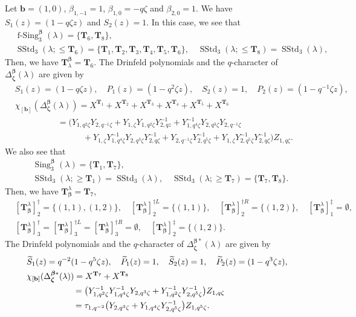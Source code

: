 \documentclass[12pt]{amsart}
\numberwithin{equation}{thm}
\newcommand\bT{\mathbf T}
\newcommand\bb{\mathbf b}
\renewcommand\b{\beta}   %
\newcommand\z{\zeta}
\newcommand\la{\lambda}
\newcommand\ta{\tau}
\newcommand\D{\Delta}
\newcommand\Bb{\boldsymbol\beta}
\newcommand\Bz{\boldsymbol\zeta}
\newcommand\wt{\widetilde}
\newcommand{\SStd}{\operatorname{SStd}}
\newcommand{\Sing}{\operatorname{Sing}}
\newcommand{\fSing}{\operatorname{f-Sing}}
\begin{document}
Let $\bb=(1,0)$, $\b_{1,-1}=1 $, $\b_{1,0}= - q \z$ and $\b_{2,0}=1$. 
We have $S_1(z) = (1 - q \z  z)$ and $S_2(z)=1$. 
In this case, we see that 
\begin{align*}
&\fSing_3^{\Bb} (\la) = \{ \bT_6, \bT_8\}, 
\\
&\SStd_3 (\la ; \leq \bT_6) = \{ \bT_1, \bT_2, \bT_3, \bT_4, \bT_5, \bT_6\}, 
\quad 
\SStd_3 (\la ; \leq \bT_8) = \SStd_3 (\la), 
\end{align*}
Then, we have 
$\bT_{\la}^{\Bb} = \bT_6$. 
The Drinfeld polynomials and the $q$-character of $\D_{\Bz}^{\Bb} (\la)$ are given by 
\begin{align*}
&S_1(z) = (1 - q\z  z), \quad P_1(z) = (1- q^{2} \z z), 
\quad 
S_2(z) =1, \quad P_2(z) = (1 - q^{-1} \z z), 
\\
& \chi_{[\bb]} (\D_{\Bz}^{\Bb}(\la)) 
= X^{\bT_1} + X^{\bT_2} + X^{\bT_3} + X^{\bT_4} + X^{\bT_5} + X^{\bT_6} 
\\& \hspace{5em} 
=  
	\big( Y_{1, q^2 \z}   Y_{2, q^{-1} \z} 
		+ Y_{1, \z} Y_{1, q^2 \z} Y_{2, q z}^{-1} 
		+ Y_{1, q^4 \z}^{-1} Y_{2, q^3 \z} Y_{2, q^{-1} \z} 
		\\ & \hspace{8em} 
		+ Y_{1, \z} Y_{1, q^4 \z}^{-1} Y_{2, q^3 \z} Y_{2, q \z}^{-1} 
		+ Y_{2, q^{-1} \z} Y_{2, q^5 \z}^{-1} 
		+ Y_{1, \z} Y_{2, q^5 \z}^{-1} Y_{2, q \z}^{-1} 
	\big) Z_{1, q \z}. 
\end{align*}
We also see that 
\begin{align*}
& \Sing_3^{\Bb} (\la) = \{ \bT_1, \bT_7\}, 
\\
& \SStd_3 (\la ; \geq \bT_1) = \SStd_3(\la), 
\quad 
\SStd_3 (\la ; \geq \bT_7) = \{ \bT_7, \bT_8\}. 
\end{align*}
Then, we have $\bT_{\Bb}^{\la} = \bT_7$, 
\begin{align*}
&[\bT_{\Bb}^{\la}]_2^{\dag} = \{ (1,1), (1,2)\}, 
\quad 
[\bT_{\Bb}^{\la}]_2^{\dag L} = \{(1,1)\}, 
\quad 
[\bT_{\Bb}^{\la}]_2^{\dag R} =\{(1,2)\}, 
\quad 
[\bT_{\Bb}^{\la}]_1^{\ddag} = \emptyset, 
\\
&[\bT_{\Bb}^{\la}]_3^{\dag} = [\bT_{\Bb}^{\la}]_3^{\dag L} = [\bT_{\Bb}^{\la}]_3^{\dag R} = \emptyset,  
\quad 
[\bT_{\Bb}^{\la}]_2^{\ddag} = \{ (1,2)\}.
\end{align*}
The Drinfeld polynomials and the $q$-character of $\D_{\Bz}^{\Bb *}(\la)$ are given by 
\begin{align*}
&\wt{S}_1(z) = q^{-2 } (1 - q^5 \z z), 
\quad 
\wt{P}_1(z)= 1, 
\quad 
\wt{S}_2(z) =1, 
\quad 
\wt{P}_2(z) = (1 - q^3 \z z), 
\\
& \chi_{[\bb]} (\D_{\Bz}^{\Bb*}(\la)) 
	= X^{\bT_7} + X^{\bT_8} 
	\\ & \hspace{5.5em} 
	= \big( Y_{1, q^2 \z}^{-1} Y_{1, q^4 \z}^{-1} Y_{2, q^3 \z} 
			+ Y_{1, q^2\z}^{-1}  Y_{2, q^5 \z}^{-1}  
	\big) Z_{1, q \z} 
	\\ & \hspace{5.5em} 
	= \ta_{1, q^{-2}} \big( Y_{2, q^3 \z} +   Y_{1, q^4 \z} Y_{2, q^5 \z}^{-1} \big) Z_{1, q^5 \z}. 
\end{align*}
\end{document}
